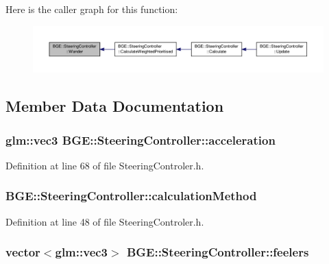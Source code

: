 Here is the caller graph for this function\-:
\nopagebreak
\begin{figure}[H]
\begin{center}
\leavevmode
\includegraphics[width=350pt]{class_b_g_e_1_1_steering_controller_a0cb8b40f2baa4e7c5a2125da562757d1_icgraph}
\end{center}
\end{figure}




\subsection{Member Data Documentation}
\hypertarget{class_b_g_e_1_1_steering_controller_ad213909130f9be8f16bb22b4ba18315c}{
\subsubsection[{acceleration}]{\setlength{\rightskip}{0pt plus 5cm}glm\-::vec3 B\-G\-E\-::\-Steering\-Controller\-::acceleration}}\label{class_b_g_e_1_1_steering_controller_ad213909130f9be8f16bb22b4ba18315c}


Definition at line 68 of file Steering\-Controler.\-h.

\hypertarget{class_b_g_e_1_1_steering_controller_a29d6bda0a3029e2ab2e19f860dfe3cb4}{
\subsubsection[{calculation\-Method}]{ B\-G\-E\-::\-Steering\-Controller\-::calculation\-Method}}\label{class_b_g_e_1_1_steering_controller_a29d6bda0a3029e2ab2e19f860dfe3cb4}


Definition at line 48 of file Steering\-Controler.\-h.

\hypertarget{class_b_g_e_1_1_steering_controller_a4bfeb793b7a81b378d3f81c5085b204e}{
\subsubsection[{feelers}]{\setlength{\rightskip}{0pt plus 5cm}vector$<$glm\-::vec3$>$ B\-G\-E\-::\-Steering\-Controller\-::feelers}}\label{class_b_g_e_1_1_steering_controller_a4bfeb793b7a81b378d3f81c5085b204e}


